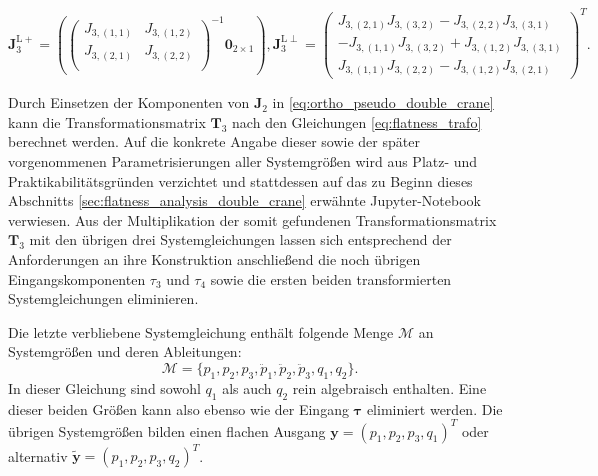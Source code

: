 \begin{equation}
	\label{eq:ortho_pseudo_double_crane}
	\mathbf{J}_3^{\mathrm{L}+} =
	\left(
	\left(\begin{matrix}
		J_{3, (1,1)} & J_{3, (1,2)}\\
		J_{3, (2,1)} & J_{3, (2,2)}\\
	\end{matrix}\right)^{-1}	
	\mathbf{0}_{2 \times 1}
	\right), 		
	\mathbf{J}_3^{\mathrm{L}\perp} =
	\left(\begin{matrix}
		J_{3, (2,1)} J_{3, (3,2)} - J_{3, (2,2)} J_{3, (3,1)} \\
		-J_{3, (1,1)} J_{3, (3,2)} + J_{3, (1,2)} J_{3, (3,1)} \\
		J_{3, (1,1)} J_{3, (2,2)} - J_{3, (1,2)} J_{3, (2,1)}
	\end{matrix}\right)^T.
\end{equation}

Durch Einsetzen der Komponenten von $\mathbf{J}_2$ in \eqref{eq:ortho_pseudo_double_crane} kann die Transformationsmatrix $\mathbf{T}_3$ nach den Gleichungen \eqref{eq:flatness_trafo} berechnet werden. Auf die konkrete Angabe dieser sowie der später vorgenommenen Parametrisierungen aller Systemgrößen wird aus Platz- und Praktikabilitätsgründen verzichtet und stattdessen auf das zu Beginn dieses Abschnitts \ref{sec:flatness_analysis_double_crane} erwähnte Jupyter-Notebook verwiesen. Aus der Multiplikation der somit gefundenen Transformationsmatrix $\mathbf{T}_3$ mit den übrigen drei Systemgleichungen lassen sich entsprechend der Anforderungen an ihre Konstruktion anschließend die noch übrigen Eingangskomponenten $\tau_{3}$ und $\tau_{4}$ sowie die ersten beiden transformierten Systemgleichungen eliminieren.

Die letzte verbliebene Systemgleichung enthält folgende Menge $\mathcal{M}$ an Systemgrößen und deren Ableitungen:
\begin{equation}
	\mathcal{M} = \{p_1, p_2, p_3, \ddot{p}_1, \ddot{p}_2, \ddot{p}_3, q_1, q_2 \}.
\end{equation}
In dieser Gleichung sind sowohl $q_1$ als auch $q_2$ rein algebraisch enthalten. Eine dieser beiden Größen kann also ebenso wie der Eingang $\boldsymbol{\tau}$ eliminiert werden. Die übrigen Systemgrößen bilden einen flachen Ausgang $\mathbf{y} = (p_1, p_2, p_3, q_1)^T$ oder alternativ ${\tilde{\mathbf{y}} = (p_1, p_2, p_3, q_2)^T}$.

